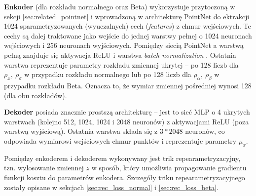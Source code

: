 \documentclass{iithesis}
\begin{document}
\textbf{Enkoder} (dla rozkładu normalnego oraz Beta) wykorzystuje przytoczoną w sekcji
\ref{sec:related_pointnet} i wprowadzoną w \cite{pointnet} architekturę PointNet do ektrakcji
1024 sparametryzowanych (wyuczalnych) cech (\textit{features}) z chmur wejściowych.
Te cechy są dalej traktowane jako wejście do jednej warstwy pełnej o 1024 neuronach wejściowych
i 256 neuronach wyjściowych. Pomiędzy siecią PointNet a warstwą pełną znajduje się aktywacja ReLU
i warstwa \textit{batch normalization} \cite{batch_normalization}.
Ostatnia warstwa reprezentuje parametry rozkładu zmiennej ukrytej --
po 128 liczb dla $\rho_x,\ \rho_\sigma$ w przypadku rozkładu normalnego lub po 128 liczb
dla $\rho_\alpha,\ \rho_\beta$ w przypadku rozkładu Beta.
Oznacza to, że wymiar zmiennej pośredniej wynosi 128 (dla obu rozkładów).

\textbf{Dekoder} posiada znacznie prostszą architekturę -- jest to sieć MLP o 4 ukrytych warstwach
(kolejno 512, 1024, 1024 i 2048 neuronów) z aktywacjami ReLU (poza warstwą wyjściową).
Ostatnia warstwa składa się z $3*2048$ neuronów, co odpowiada wymiarowi wejściowych chmur punktów
i reprezentuje parametry $\mu_x$.

Pomiędzy enkoderem i dekoderem wykonywany jest trik repearametryzacyjny,
tzn. wylosowanie zmiennej $z$ w sposób, który umożliwia propagowanie gradientu
funkcji kosztu do parametrów enkodera. Szczegóły triku repearametryzacyjnego zostały opisane
w sekcjach \ref{sec:rec_loss_normal} i \ref{sec:rec_loss_beta}.
\end{document}
